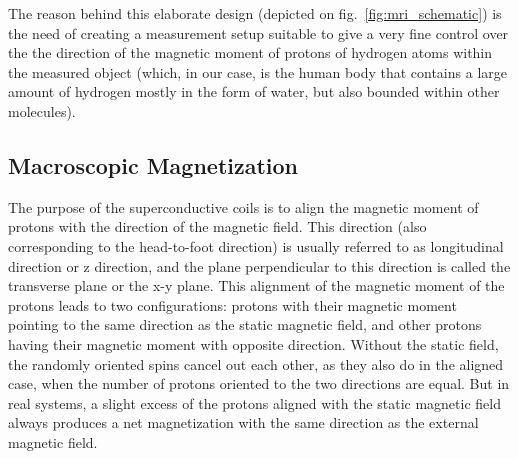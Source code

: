 The reason behind this elaborate design (depicted on fig.~\ref{fig:mri_schematic}) is the need of creating a measurement setup suitable to give a very fine control over the the direction of the magnetic moment of protons of hydrogen atoms within the measured object (which, in our case, is the human body that contains a large amount of hydrogen mostly in the form of water, but also bounded within other molecules).

\subsection{Macroscopic Magnetization}
The purpose of the superconductive coils is to align the magnetic moment of protons with the direction of the magnetic field. This direction (also corresponding to the head-to-foot direction) is usually referred to as longitudinal direction or z direction, and the plane perpendicular to this direction is called the transverse plane or the x-y plane. This alignment of the magnetic moment of the protons leads to two configurations: protons with their magnetic moment pointing to the same direction as the static magnetic field, and other protons having their magnetic moment with opposite direction. Without the static field, the randomly oriented spins cancel out each other, as they also do in the aligned case, when the number of protons oriented to the two directions are equal. But in real systems, a slight excess of the protons aligned with the static magnetic field always produces a net magnetization with the same direction as the external magnetic field.

